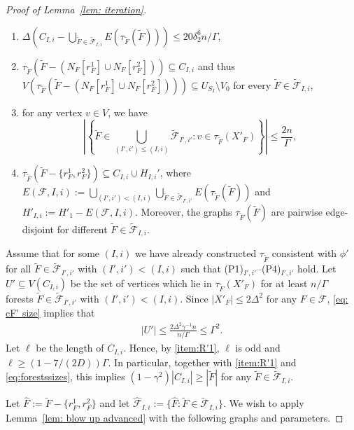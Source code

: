 \documentclass[a4paper, 11pt, reqno]{amsart}
\numberwithin{equation}{section}
\newcommand{\1}{{\rm 1\hspace*{-0.4ex}%
\rule{0.1ex}{1.52ex}\hspace*{0.2ex}}}
\newcommand{\cF}{\mathcal{F}}
\newcommand{\I}{I}
\newcommand{\sm}{\setminus}
\newcommand{\sub}{\subseteq}
\begin{document}
\begin{proof}[Proof of Lemma~\ref{lem: iteration}]
\begin{enumerate}[label=(P\arabic*)$_{{\I},i}$]
\item\label{item:P1} $\Delta(C_{{\I},i}  - \bigcup_{\tilde{F}\in \tilde{\cF}_{{\I},i}} E(\tau_{\tilde{F}}(\tilde{F})))
\leq 20\delta_2^6 n/\Gamma$,
\item\label{item:P2} $\tau_{\tilde{F}}(\tilde{F} - (N_{F}[r^1_F]\cup N_{F}[r^2_F])) \subseteq C_{{\I},i}$ 
and thus $V(\tau_{\tilde{F}}(\tilde{F}-(N_{F}[r^1_F]\cup N_{F}[r^2_F])))\sub U_{S_\I}\sm V_0$
for every $\tilde{F} \in \tilde{\cF}_{{\I},i}$, 
\item\label{item:P3} for any vertex $v\in V$, we have 
$$\left|\left\{\tilde{F}  \in \bigcup_{({\I}',i')\leq ({\I},i)} \tilde{\cF} _{{\I}',i'}: v\in \tau_{\tilde{F} }(X'_{F})\right\}\right| 
\leq \frac{2n}{\Gamma},$$
\item\label{item:P4} $\tau_{\tilde{F}}(\tilde{F}-\{r_F^1,r_F^2\})\sub C_{{\I},i}\cup H_{{\I},i}'$,
where $E(\cF,{\I},i):= \bigcup_{({\I}',i')< ({\I},i)} \bigcup_{\tilde{F}\in \tilde{\cF}_{{\I}',i'}} E(\tau_{\tilde{F}}(\tilde{F}))$
and $H'_{{\I},i}:=  H'_1 - E(\cF,{\I},i)$.
Moreover, the graphs $\tau_{\tilde{F}}(\tilde{F})$ are pairwise edge-disjoint for different $\tilde{F}\in \tilde{\cF}_{\I,i}$.
\end{enumerate}
Assume that for some $(I,i)$ we have already constructed $\tau_{\tilde{F}}$ consistent with $\phi'$ for all $\tilde{F} \in \tilde{\cF}_{{\I}',i'}$ with $({\I}',i')< ({\I},i)$ such that (P1)$_{{\I}',i'}$--(P4)$_{{\I}',i'}$ hold.
Let $U'\sub V(C_{\I,i})$ be the set of vertices which lie in $\tau_{\tilde{F}}(X'_F)$ for at least $n/\Gamma$ forests $\tilde{F}\in \tilde{\cF}_{{\I}',i'}$ with $({\I}',i')< ({\I},i)$. 
Since $|X'_{F}|\leq 2\Delta^2$ for any $F\in \cF$, \eqref{eq: cF' size} implies that 
\begin{align}\label{eq: U' size}
|U'| \leq \frac{2 \Delta^2\gamma^{-1}n }{n/\Gamma} \leq \Gamma^{2}.
\end{align}
Let $\ell$ be the length of $C_{{\I},i}$. 
Hence, by \ref{item:R'1}, $\ell$ is odd and $\ell\geq (1- 7/(2D))\Gamma$. 
In particular, together with \ref{item:R'1} and \eqref{eq:forestssizes}, 
this implies $(1-\gamma^2)|C_{{\I},i}| \geq |\tilde{F}|$ for any $\tilde{F}\in \tilde{\cF}_{{\I},i}$. 

Let $\hat{F}:= \tilde{F}- \{r^1_{F}, r^2_{F}\}$ and let $\hat{\cF}_{{\I},i}:=\{\hat{F}: \tilde{F}\in \tilde{\cF}_{{\I},i}\}$.
We wish to apply Lemma~\ref{lem: blow up advanced} with the following graphs and parameters. \newline


\end{proof}
\end{document}
